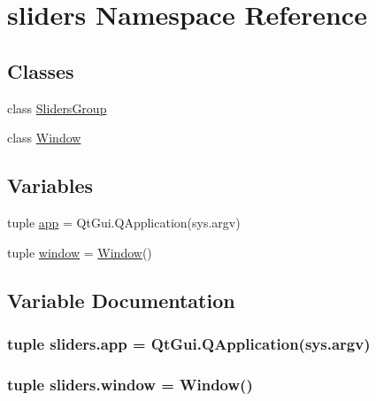 \hypertarget{namespacesliders}{}\section{sliders Namespace Reference}
\label{namespacesliders}
\subsection*{Classes}
\begin{DoxyCompactItemize}
\item 
class \hyperlink{classsliders_1_1SlidersGroup}{Sliders\+Group}
\item 
class \hyperlink{classsliders_1_1Window}{Window}
\end{DoxyCompactItemize}
\subsection*{Variables}
\begin{DoxyCompactItemize}
\item 
tuple \hyperlink{namespacesliders_a7787c3fb93a0fb079a1539dea275afc9}{app} = Qt\+Gui.\+Q\+Application(sys.\+argv)
\item 
tuple \hyperlink{namespacesliders_a24bdf5942ecf23bee3c9f06a36763558}{window} = \hyperlink{classsliders_1_1Window}{Window}()
\end{DoxyCompactItemize}


\subsection{Variable Documentation}
\hypertarget{namespacesliders_a7787c3fb93a0fb079a1539dea275afc9}{}
\subsubsection[{app}]{\setlength{\rightskip}{0pt plus 5cm}tuple sliders.\+app = Qt\+Gui.\+Q\+Application(sys.\+argv)}\label{namespacesliders_a7787c3fb93a0fb079a1539dea275afc9}
\hypertarget{namespacesliders_a24bdf5942ecf23bee3c9f06a36763558}{}
\subsubsection[{window}]{\setlength{\rightskip}{0pt plus 5cm}tuple sliders.\+window = {\bf Window}()}\label{namespacesliders_a24bdf5942ecf23bee3c9f06a36763558}
